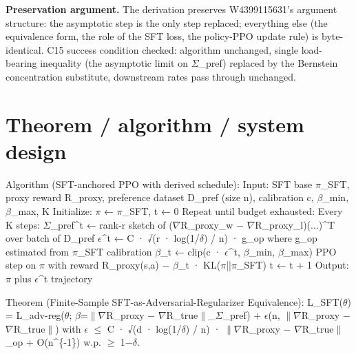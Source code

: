 \documentclass[10pt,a4paper]{article}
\begin{document}
\begin{tcolorbox}[colback=bgskill, colframe=cblue, title=\textbf{NoveltySkill — Idea Card (L3 Oral-Ready)}, breakable]

\textbf{Preservation argument.} The derivation preserves W4399115631's argument structure: the asymptotic step is the only step replaced; everything else (the equivalence form, the role of the SFT loss, the policy-PPO update rule) is byte-identical. C15 success condition checked: algorithm unchanged, single load-bearing inequality (the asymptotic limit on $\Sigma$\_pref) replaced by the Bernstein concentration substitute, downstream rates pass through unchanged.

\section*{Theorem / algorithm / system design}
Algorithm (SFT-anchored PPO with derived schedule):
  Input: SFT base $\pi$\_SFT, proxy reward R\_proxy, preference dataset D\_pref (size n), calibration c, $\beta$\_min, $\beta$\_max, K
  Initialize: $\pi$ ← $\pi$\_SFT, t ← 0
  Repeat until budget exhausted:
    Every K steps:
      $\Sigma$\_pref\textasciicircum{}t ← rank-r sketch of ($\nabla$R\_proxy\_w − $\nabla$R\_proxy\_l)(...)\textasciicircum{}T over batch of D\_pref
      $\epsilon$\textasciicircum{}t ← C · √(r · log(1/$\delta$) / n) · g\_op   where g\_op estimated from $\pi$\_SFT calibration
      $\beta$\_t ← clip(c · $\epsilon$\textasciicircum{}t, $\beta$\_min, $\beta$\_max)
    PPO step on $\pi$ with reward R\_proxy(s,a) − $\beta$\_t · KL($\pi$||$\pi$\_SFT)
    t ← t + 1
  Output: $\pi$ plus $\epsilon$\textasciicircum{}t trajectory

Theorem (Finite-Sample SFT-as-Adversarial-Regularizer Equivalence): L\_SFT($\theta$) = L\_adv-reg($\theta$; $\beta$=$\|$$\nabla$R\_proxy − $\nabla$R\_true$\|$\_$\Sigma$\_pref) + $\epsilon$(n, $\|$$\nabla$R\_proxy − $\nabla$R\_true$\|$) with $\epsilon$ $\le$ C · √(d · log(1/$\delta$) / n) · $\|$$\nabla$R\_proxy − $\nabla$R\_true$\|$\_op + O(n\textasciicircum{}\{-1\}) w.p. $\ge$ 1−$\delta$.


\end{tcolorbox}
\end{document}
